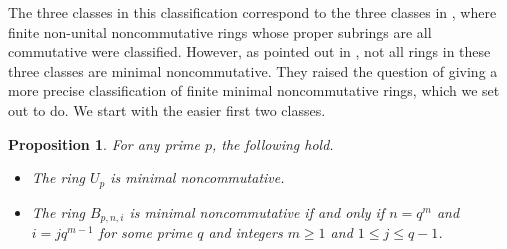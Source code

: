 \documentclass[11pt]{article}
\newtheorem{proposition}[corollary]{Proposition}
\theoremstyle{definition}
\begin{document}
The three classes in this classification correspond to the three classes in \cite[\S 3]{Redei_OneStepNoncommutativeFinite}, where finite non-unital noncommutative rings whose proper subrings are all commutative were classified. However, as pointed out in \cite[Remark~2.6]{BellandDanchev}, not all rings in these three classes are minimal noncommutative. They raised the question of giving a more precise classification of finite minimal noncommutative rings, which we set out to do. We start with the easier first two classes.

\begin{proposition}\label{FirstTwoClasses}
For any prime $p$, the following hold.
\begin{itemize}[topsep=0pt]
\item[(1)] The ring $U_p$ is minimal noncommutative.
\item[(2)] The ring $B_{p,n,i}$ is minimal noncommutative if and only if $n=q^m$ and $i=jq^{m-1}$ for some prime $q$ and integers $m\geq 1$ and $1\leq j\leq q-1$.
\end{itemize}
\end{proposition}
\end{document}
